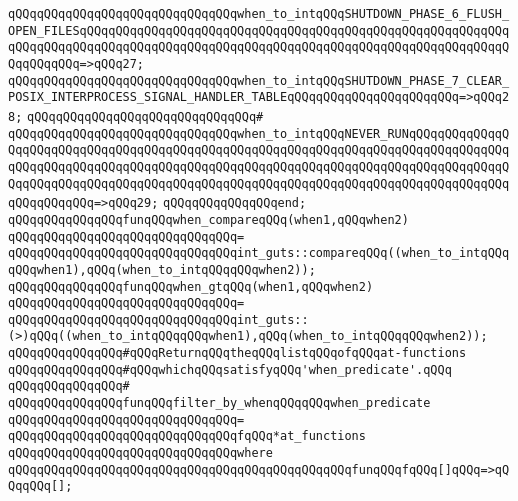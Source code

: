 \verb|qQQqqQQqqQQqqQQqqQQqqQQqqQQqqQQqwhen_to_intqQQqSHUTDOWN_PHASE_6_FLUSH_OPEN_FILESqQQqqQQqqQQqqQQqqQQqqQQqqQQqqQQqqQQqqQQqqQQqqQQqqQQqqQQqqQQqqQQqqQQqqQQqqQQqqQQqqQQqqQQqqQQqqQQqqQQqqQQqqQQqqQQqqQQqqQQqqQQqqQQqqQQqqQQqqQQq=>qQQq27;|\newline
\verb|qQQqqQQqqQQqqQQqqQQqqQQqqQQqqQQqwhen_to_intqQQqSHUTDOWN_PHASE_7_CLEAR_POSIX_INTERPROCESS_SIGNAL_HANDLER_TABLEqQQqqQQqqQQqqQQqqQQqqQQq=>qQQq28;|\newline
\verb|qQQqqQQqqQQqqQQqqQQqqQQqqQQqqQQq#|\newline
\verb|qQQqqQQqqQQqqQQqqQQqqQQqqQQqqQQqwhen_to_intqQQqNEVER_RUNqQQqqQQqqQQqqQQqqQQqqQQqqQQqqQQqqQQqqQQqqQQqqQQqqQQqqQQqqQQqqQQqqQQqqQQqqQQqqQQqqQQqqQQqqQQqqQQqqQQqqQQqqQQqqQQqqQQqqQQqqQQqqQQqqQQqqQQqqQQqqQQqqQQqqQQqqQQqqQQqqQQqqQQqqQQqqQQqqQQqqQQqqQQqqQQqqQQqqQQqqQQqqQQqqQQqqQQqqQQqqQQqqQQqqQQqqQQq=>qQQq29;|\newline
\verb|qQQqqQQqqQQqqQQqend;|\newline
\newline
\verb|qQQqqQQqqQQqqQQqfunqQQqwhen_compareqQQq(when1,qQQqwhen2)|\newline
\verb|qQQqqQQqqQQqqQQqqQQqqQQqqQQqqQQq=|\newline
\verb|qQQqqQQqqQQqqQQqqQQqqQQqqQQqqQQqint_guts::compareqQQq((when_to_intqQQqqQQqwhen1),qQQq(when_to_intqQQqqQQqwhen2));|\newline
\newline
\verb|qQQqqQQqqQQqqQQqfunqQQqwhen_gtqQQq(when1,qQQqwhen2)|\newline
\verb|qQQqqQQqqQQqqQQqqQQqqQQqqQQqqQQq=|\newline
\verb|qQQqqQQqqQQqqQQqqQQqqQQqqQQqqQQqint_guts::(>)qQQq((when_to_intqQQqqQQqwhen1),qQQq(when_to_intqQQqqQQqwhen2));|\newline
\newline
\verb|qQQqqQQqqQQqqQQq#qQQqReturnqQQqtheqQQqlistqQQqofqQQqat-functions|\newline
\verb|qQQqqQQqqQQqqQQq#qQQqwhichqQQqsatisfyqQQq'when_predicate'.qQQq|\newline
\verb|qQQqqQQqqQQqqQQq#|\newline
\verb|qQQqqQQqqQQqqQQqfunqQQqfilter_by_whenqQQqqQQqwhen_predicate|\newline
\verb|qQQqqQQqqQQqqQQqqQQqqQQqqQQqqQQq=|\newline
\verb|qQQqqQQqqQQqqQQqqQQqqQQqqQQqqQQqfqQQq*at_functions|\newline
\verb|qQQqqQQqqQQqqQQqqQQqqQQqqQQqqQQqwhere|\newline
\verb|qQQqqQQqqQQqqQQqqQQqqQQqqQQqqQQqqQQqqQQqqQQqqQQqfunqQQqfqQQq[]qQQq=>qQQqqQQq[];|\newline
